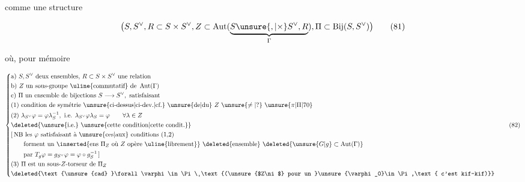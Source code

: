 
comme une structure

\[
\bigl(S,S^\vee,R\subset S\times S^\vee,Z\subset\operatorname{Aut}(\underbrace{S\unsure{,|\times}S^\vee,R}_{\Gamma}),\Pi\subset\operatorname{Bij}(S,S^\vee)\bigr)\tag*{(81)}
\]

où, pour mémoire

\[
\left\{\begin{aligned}
&\text{a) } S,S^\vee\text{ deux ensembles, }R\subset S\times S^\vee\text{ une relation}\\
&\text{b) } Z\text{ un sous-groupe \uline{commutatif} de }\operatorname{Aut}(\Gamma)\\
&\text{c) } \Pi\text{ un ensemble de bijections }S\longrightarrow S^\vee,\text{ satisfaisant}\\
&\text{(1) condition de symétrie \unsure{ci-dessus|ci-dev.|cf.} \unsure{de|du} }Z\ \unsure{\ne|?}\ \unsure{\pi|\Pi|70}\\
&\text{(2) }\lambda_{S^\vee}\varphi=\varphi\lambda_S^{-1},\text{ i.e. }\lambda_{S^\vee}\varphi\lambda_S=\varphi\qquad\forall\lambda\in Z\\
&\deleted{\text{\unsure{i.e.} \unsure{cette condition|cette condit.}}}\\
&[\,\mathrm{NB}\ \text{les }\varphi\text{ satisfaisant à \unsure{ces|aux} conditions (1,2)}\\
&\qquad\text{forment un }\inserted{\text{ens }\Pi_Z\ \text{où }Z\text{ opère \uline{librement}}}\ \deleted{\text{ensemble}}\ \deleted{\unsure{G|g}\subset\operatorname{Aut}(\Gamma)}\\
&\qquad\text{par }T_g\varphi=g_{S^\vee}\varphi=\varphi\circ g_S^{-1}\,]\\
&\text{(3) }\Pi\text{ est un sous-}Z\text{-torseur de }\Pi_Z\\
&\deleted{\text{\unsure{cad} }\forall\varphi\in\Pi\ \text{(\unsure{$Z\ni$} pour un }\unsure{\varphi_0}\in\Pi,\text{ c'est kif-kif)}}
\end{aligned}\right.\tag*{(82)}
\]



